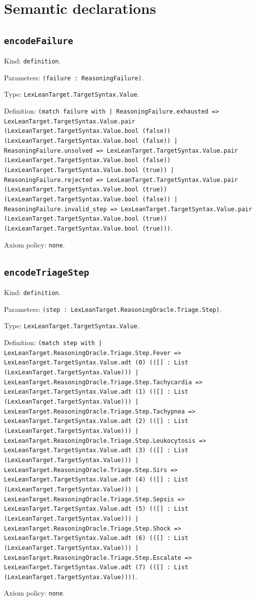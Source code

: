 \documentclass[11pt]{article}
\begin{document}
\section*{Semantic declarations}
\subsection*{\texttt{encodeFailure}}
\noindent Kind: \texttt{definition}.\par
\noindent Parameters: \texttt{(failure : ReasoningFailure)}.\par
\noindent Type: \texttt{LexLeanTarget.TargetSyntax.Value}.\par
\noindent Definition: \texttt{(match failure with | ReasoningFailure.exhausted => LexLeanTarget.TargetSyntax.Value.pair (LexLeanTarget.TargetSyntax.Value.bool (false)) (LexLeanTarget.TargetSyntax.Value.bool (false)) | ReasoningFailure.unsolved => LexLeanTarget.TargetSyntax.Value.pair (LexLeanTarget.TargetSyntax.Value.bool (false)) (LexLeanTarget.TargetSyntax.Value.bool (true)) | ReasoningFailure.rejected => LexLeanTarget.TargetSyntax.Value.pair (LexLeanTarget.TargetSyntax.Value.bool (true)) (LexLeanTarget.TargetSyntax.Value.bool (false)) | ReasoningFailure.invalid\_step => LexLeanTarget.TargetSyntax.Value.pair (LexLeanTarget.TargetSyntax.Value.bool (true)) (LexLeanTarget.TargetSyntax.Value.bool (true)))}.\par
\noindent Axiom policy: \texttt{none}.\par
\subsection*{\texttt{encodeTriageStep}}
\noindent Kind: \texttt{definition}.\par
\noindent Parameters: \texttt{(step : LexLeanTarget.ReasoningOracle.Triage.Step)}.\par
\noindent Type: \texttt{LexLeanTarget.TargetSyntax.Value}.\par
\noindent Definition: \texttt{(match step with | LexLeanTarget.ReasoningOracle.Triage.Step.Fever => LexLeanTarget.TargetSyntax.Value.adt (0) (([] : List (LexLeanTarget.TargetSyntax.Value))) | LexLeanTarget.ReasoningOracle.Triage.Step.Tachycardia => LexLeanTarget.TargetSyntax.Value.adt (1) (([] : List (LexLeanTarget.TargetSyntax.Value))) | LexLeanTarget.ReasoningOracle.Triage.Step.Tachypnea => LexLeanTarget.TargetSyntax.Value.adt (2) (([] : List (LexLeanTarget.TargetSyntax.Value))) | LexLeanTarget.ReasoningOracle.Triage.Step.Leukocytosis => LexLeanTarget.TargetSyntax.Value.adt (3) (([] : List (LexLeanTarget.TargetSyntax.Value))) | LexLeanTarget.ReasoningOracle.Triage.Step.Sirs => LexLeanTarget.TargetSyntax.Value.adt (4) (([] : List (LexLeanTarget.TargetSyntax.Value))) | LexLeanTarget.ReasoningOracle.Triage.Step.Sepsis => LexLeanTarget.TargetSyntax.Value.adt (5) (([] : List (LexLeanTarget.TargetSyntax.Value))) | LexLeanTarget.ReasoningOracle.Triage.Step.Shock => LexLeanTarget.TargetSyntax.Value.adt (6) (([] : List (LexLeanTarget.TargetSyntax.Value))) | LexLeanTarget.ReasoningOracle.Triage.Step.Escalate => LexLeanTarget.TargetSyntax.Value.adt (7) (([] : List (LexLeanTarget.TargetSyntax.Value))))}.\par
\noindent Axiom policy: \texttt{none}.\par
\end{document}
